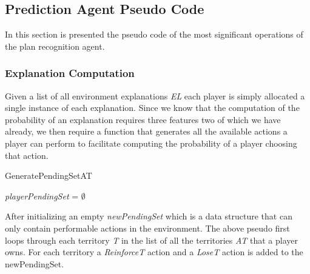 \documentclass[parskip]{cs4rep}
\begin{document}
\subsection{Prediction Agent Pseudo Code}

In this section is presented the pseudo code of the most significant operations of the plan recognition agent.

\subsubsection{Explanation Computation}

Given a list of all environment explanations \textit{EL} each player is simply allocated a single instance of each explanation. Since we know that the computation of the probability of an explanation requires three features two of which we have already, we then require a function that generates all the available actions a player can perform to facilitate computing the probability of a player choosing that action.

\begin{pseudocode}{GeneratePendingSet}{AT}
\begin{algorithm}[H]
\textit{playerPendingSet} = $\emptyset$

\end{algorithm}
\end{pseudocode}

After initializing an empty \textit{newPendingSet} which is a data structure that can only contain performable actions in the environment. The above pseudo first loops through each territory \textit{T} in the list of all the territories \textit{AT} that a player owns. For each territory a \textit{ReinforceT} action and a \textit{LoseT} action is added to the newPendingSet. 
\end{document}
